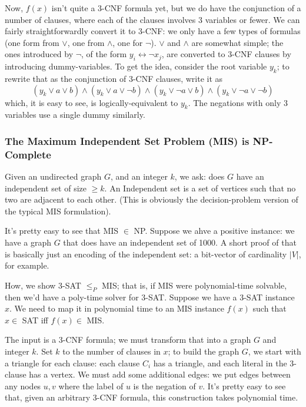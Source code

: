 \documentclass{article}
\begin{document}
Now, $f(x)$ isn't quite a 3-CNF formula yet, but we do have the conjunction of
a number of clauses, where each of the clauses involves 3 variables or
fewer. We can fairly straightforwardly convert it to 3-CNF: we only have
a few types of formulas (one form from $\vee$, one from $\wedge$, one
for $\neg$).
$\vee$ and $\wedge$ are somewhat simple; the ones introduced by $\neg$,
of the form $y_i \leftrightarrow \neg x_j$, are converted to 3-CNF clauses
by introducing dummy-variables.
To get the idea, consider the root variable $y_k$; to rewrite that as the
conjunction of 3-CNF clauses, write it as
$$
(y_k \vee a \vee b) \wedge 
(y_k \vee a \vee \neg b) \wedge
(y_k \vee \neg a \vee b) \wedge 
(y_k \vee \neg a \vee \neg b)
$$
which, it is easy to see, is logically-equivalent to $y_k$.
The negations with only 3 variables use a single dummy similarly.



\subsubsection{The Maximum Independent Set Problem (MIS) is NP-Complete}

Given an undirected graph $G$, and an integer $k$, we ask: does $G$ have
an independent set of size $\geq k$.
An Independent set is a set of vertices such that no two are adjacent to
each other.
(This is obviously the decision-problem version of the typical MIS 
formulation).

It's pretty easy to see that MIS $\in$ NP. Suppose we ahve a positive instance:
we have a graph $G$ that does have an independent set of 1000. A short proof
of that is basically just an encoding of the independent set: a bit-vector
of cardinality $|V|$, for example.

How, we show 3-SAT $\leq_P$ MIS; that is, if MIS were polynomial-time solvable,
then we'd have a poly-time solver for 3-SAT.
Suppose we have a 3-SAT instance $x$.
We need to map it in polynomial time to an MIS instance $f(x)$ such that
$x\in $ SAT iff $f(x)\in$ MIS.

The input is a 3-CNF formula; we must transform that into a graph $G$ and
integer $k$.
Set $k$ to the number of clauses in $x$; to build the graph $G$, we start
with a triangle for each clause: each clause $C_i$ has a triangle,
and each literal in the 3-clause has a vertex.
We must add some additional edges: we put edges between any nodes $u,v$ where
the label of $u$ is the negation of $v$.
It's pretty easy to see that, given an arbitrary 3-CNF formula, this 
construction
takes polynomial time.
\end{document}
